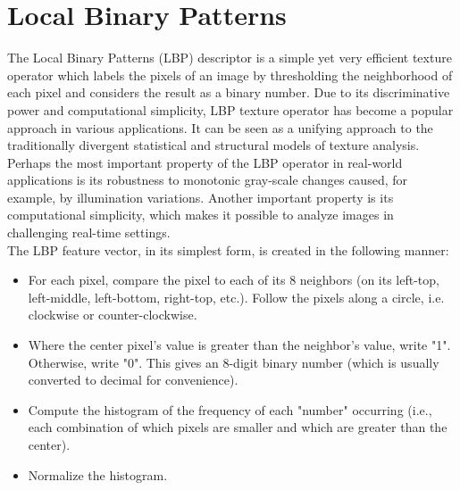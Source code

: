 \section{Local Binary Patterns}
The Local Binary Patterns (LBP) descriptor is a simple yet very efficient texture operator which labels the pixels of an image by thresholding the neighborhood of each pixel and considers the result as a binary number. Due to its discriminative power and computational simplicity, LBP texture operator has become a popular approach in various applications. It can be seen as a unifying approach to the traditionally divergent statistical and structural models of texture analysis. Perhaps the most important property of the LBP operator in real-world applications is its robustness to monotonic gray-scale changes caused, for example, by illumination variations. Another important property is its computational simplicity, which makes it possible to analyze images in challenging real-time settings.\\
The LBP feature vector, in its simplest form, is created in the following manner:
\begin{itemize}
\item For each pixel, compare the pixel to each of its 8 neighbors (on its left-top, left-middle, left-bottom, right-top, etc.). Follow the pixels along a circle, i.e. clockwise or counter-clockwise.
\item Where the center pixel's value is greater than the neighbor's value, write "1". Otherwise, write "0". This gives an 8-digit binary number (which is usually converted to decimal for convenience).
\item Compute the histogram of the frequency of each "number" occurring (i.e., each combination of which pixels are smaller and which are greater than the center).
\item Normalize the histogram.
\end{itemize}

